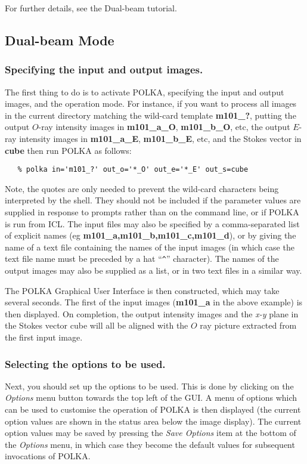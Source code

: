 \documentclass[11pt]{article}
\newcommand{\htmlref}[2]{#1}
\newcommand{\xlabel}[1]{}
\newcommand{\mylabel}[1] {\xlabel{#1}\label{#1}}
\begin{document}
For further details, see the \htmlref{Dual-beam tutorial}{POLKA_DBEAM_TUT}.

\subsection {\mylabel{POLKA_DBEAM_TUT}Dual-beam Mode}

\subsubsection {Specifying the input and output images.}
The first thing to do is to activate POLKA, specifying the input and
output images, and the operation mode. For instance, if you
want to process all images in the current directory matching the wild-card
template {\bf m101\_?}, putting the output $O$-ray intensity images
in {\bf m101\_a\_O}, {\bf m101\_b\_O}, etc, the output $E$-ray intensity
images in {\bf m101\_a\_E}, {\bf m101\_b\_E}, etc, and the Stokes vector
in {\bf cube} then run POLKA as follows:

\begin{verbatim}
   % polka in='m101_?' out_o='*_O' out_e='*_E' out_s=cube
\end{verbatim}

Note, the quotes are only needed to prevent the wild-card characters
being interpreted by the shell. They should not be included if the
parameter values are supplied in response to prompts rather than on the
command line, or if POLKA is run from ICL. The input files may also be
specified by a comma-separated list of explicit names (eg {\bf
m101\_a,m101\_b,m101\_c,m101\_d}), or by giving the name of a text file
containing the names of the input images (in which case the text file
name must be preceded by a hat ``\verb+^+'' character). The names of the
output images may also be supplied as a list, or in two text files in a
similar way.

The POLKA Graphical User Interface is then constructed, which may take
several seconds. The first of the input images ({\bf m101\_a} in the
above example) is then displayed. On completion, the output intensity
images and the \emph{x-y} plane in the Stokes vector cube will all be
aligned with the $O$ ray picture extracted from the first input image.

\subsubsection {Selecting the options to be used.}
Next, you should set up the options to be used. This is done by clicking
on the \htmlref{\emph{Options}}{POLKA_OPTIONS_MENU} menu button towards
the top left of the GUI. A menu of options which can be used to customise
the operation of POLKA is then displayed (the current option values are
shown in the \htmlref{status area}{POLKA_STATUS_AREA} below the image
display). The current option values may be saved by pressing the {\em
Save Options} item at the bottom of the \emph{Options} menu, in which case
they become the default values for subsequent invocations of POLKA.
\end{document}
